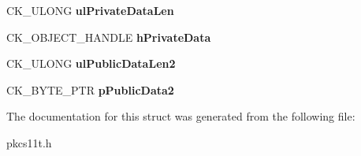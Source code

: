 \begin{DoxyCompactItemize}
C\+K\+\_\+\+U\+L\+O\+NG {\bfseries ul\+Private\+Data\+Len}
\item 
\mbox{\label{struct_c_k___x9__42___d_h2___d_e_r_i_v_e___p_a_r_a_m_s_af7f9986bdf98412d3dcfff901392afb9}} 
C\+K\+\_\+\+O\+B\+J\+E\+C\+T\+\_\+\+H\+A\+N\+D\+LE {\bfseries h\+Private\+Data}
\item 
\mbox{\label{struct_c_k___x9__42___d_h2___d_e_r_i_v_e___p_a_r_a_m_s_ac76cae55438971946095a6d59ddfe376}} 
C\+K\+\_\+\+U\+L\+O\+NG {\bfseries ul\+Public\+Data\+Len2}
\item 
\mbox{\label{struct_c_k___x9__42___d_h2___d_e_r_i_v_e___p_a_r_a_m_s_a9a073b51cd21a777a3acf6df9d759bd4}} 
C\+K\+\_\+\+B\+Y\+T\+E\+\_\+\+P\+TR {\bfseries p\+Public\+Data2}
\end{DoxyCompactItemize}


The documentation for this struct was generated from the following file\+:\begin{DoxyCompactItemize}
\item 
pkcs11t.\+h\end{DoxyCompactItemize}

